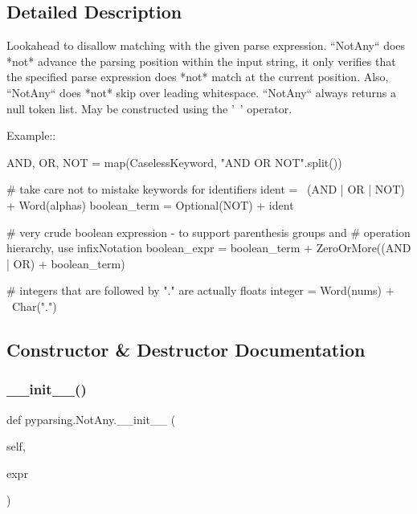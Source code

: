\subsection{Detailed Description}
\begin{DoxyVerb}Lookahead to disallow matching with the given parse expression.
``NotAny`` does *not* advance the parsing position within the
input string, it only verifies that the specified parse expression
does *not* match at the current position.  Also, ``NotAny`` does
*not* skip over leading whitespace. ``NotAny`` always returns
a null token list.  May be constructed using the '~' operator.

Example::

    AND, OR, NOT = map(CaselessKeyword, "AND OR NOT".split())

    # take care not to mistake keywords for identifiers
    ident = ~(AND | OR | NOT) + Word(alphas)
    boolean_term = Optional(NOT) + ident

    # very crude boolean expression - to support parenthesis groups and
    # operation hierarchy, use infixNotation
    boolean_expr = boolean_term + ZeroOrMore((AND | OR) + boolean_term)

    # integers that are followed by "." are actually floats
    integer = Word(nums) + ~Char(".")
\end{DoxyVerb}
 

\subsection{Constructor \& Destructor Documentation}
\mbox{\label{classpyparsing_1_1NotAny_a3880c985fe2b130fd6b215179812129a}} 
\subsubsection{\texorpdfstring{\+\_\+\+\_\+init\+\_\+\+\_\+()}{\_\_init\_\_()}}
{\footnotesize\ttfamily def pyparsing.\+Not\+Any.\+\_\+\+\_\+init\+\_\+\+\_\+ (\begin{DoxyParamCaption}\item[{}]{self,  }\item[{}]{expr }\end{DoxyParamCaption})}



